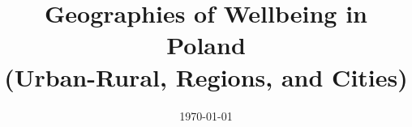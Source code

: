 \documentclass[10pt, letterpaper]{article}
\date{{}\today \hspace{.2in}\xxivtime}
\title{  %
  Geographies of Wellbeing in Poland\\ (Urban-Rural, Regions, and Cities) 
}
\author{
}
\begin{document}


\maketitle
\vspace{-.4in}
\begin{center}

\end{center}


\begin{abstract}
\noindent
\end{abstract}
\vspace{.15in} 
\noindent{\sc %
}
\vspace{.25in} 

\vspace{-1in} 
\end{document}
